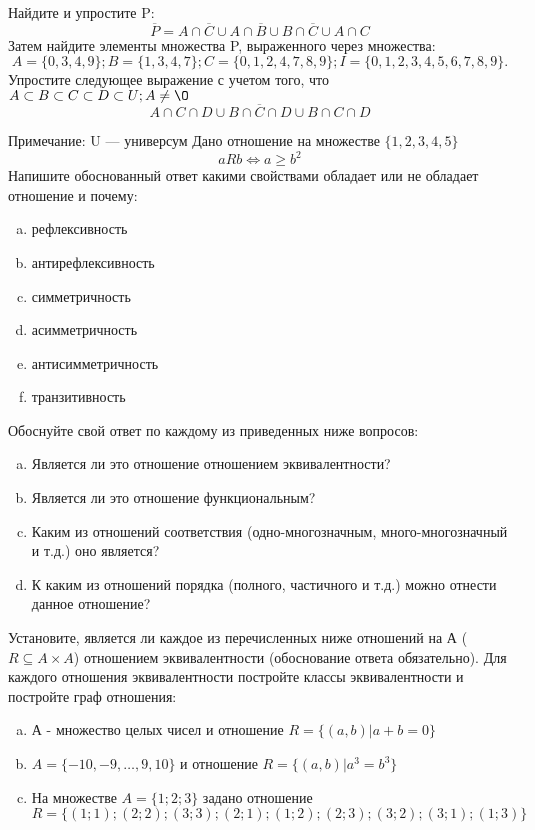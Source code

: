 \documentclass[10pt]{exam}
\begin{document}
\begin{questions}
\question
Найдите и упростите P:
\begin{equation*}
\overline{P} = A \cap \overline{C} \cup A \cap \overline{B} \cup B \cap \overline{C} \cup A \cap C
\end{equation*}
Затем найдите элементы множества P, выраженного через множества:
\begin{equation*}
A = \{0, 3, 4, 9\}; 
B = \{1, 3, 4, 7\};
C = \{0, 1, 2, 4, 7, 8, 9\};
I = \{0, 1, 2, 3, 4, 5, 6, 7, 8, 9\}.
\end{equation*}\question
Упростите следующее выражение с учетом того, что $A\subset B \subset C \subset D \subset U; A \neq \O$
\begin{equation*}
A \cap C  \cap D \cup B \cap \overline{C} \cap D \cup B \cap C \cap D
\end{equation*}

Примечание: U — универсум\question
Дано отношение на множестве $\{1, 2, 3, 4, 5\}$ 
\begin{equation*}
aRb \iff a \geq b^2
\end{equation*}
Напишите обоснованный ответ какими свойствами обладает или не обладает отношение и почему:   
\begin{enumerate} [a)]\setcounter{enumi}{0}
\item рефлексивность
\item антирефлексивность
\item симметричность
\item асимметричность
\item антисимметричность
\item транзитивность
\end{enumerate}

Обоснуйте свой ответ по каждому из приведенных ниже вопросов:
\begin{enumerate} [a)]\setcounter{enumi}{0}
    \item Является ли это отношение отношением эквивалентности?
    \item Является ли это отношение функциональным?
    \item Каким из отношений соответствия (одно-многозначным, много-многозначный и т.д.) оно является?
    \item К каким из отношений порядка (полного, частичного и т.д.) можно отнести данное отношение?
\end{enumerate}


\question
Установите, является ли каждое из перечисленных ниже отношений на А ($R \subseteq A \times A$) отношением эквивалентности (обоснование ответа обязательно). Для каждого отношения эквивалентности 
постройте классы эквивалентности и постройте граф отношения:
\begin{enumerate}[a)]\setcounter{enumi}{0}
\item А - множество целых чисел и отношение $R = \{(a,b)|a + b = 0\}$
\item $A = \{-10, -9, …, 9, 10\}$ и отношение $R = \{(a,b)|a^{3} = b^{3}\}$
\item На множестве $A = \{1; 2; 3\}$ задано отношение $R = \{(1; 1); (2; 2); (3; 3); (2; 1); (1; 2); (2; 3); (3; 2); (3; 1); (1; 3)\}$


\end{enumerate}
\end{questions}
\end{document}

